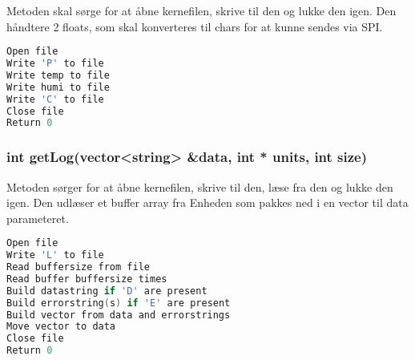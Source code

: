 Metoden skal sørge for at åbne kernefilen, skrive til den og lukke den igen.
Den håndtere 2 floats, som skal konverteres til chars for at kunne sendes via SPI.

\begin{lstlisting}[language=C]
Open file
Write 'P' to file
Write temp to file
Write humi to file
Write 'C' to file
Close file
Return 0
\end{lstlisting} 
\subsubsection*{int getLog(vector<string> \&data, int * units, int size)}

Metoden sørger for at åbne kernefilen, skrive til den, læse fra den og lukke den igen.
Den udlæser et buffer array fra Enheden som pakkes ned i en vector til data parameteret.

\begin{lstlisting}[language=C]
Open file
Write 'L' to file
Read buffersize from file
Read buffer buffersize times
Build datastring if 'D' are present
Build errorstring(s) if 'E' are present
Build vector from data and errorstrings
Move vector to data
Close file
Return 0
\end{lstlisting} 